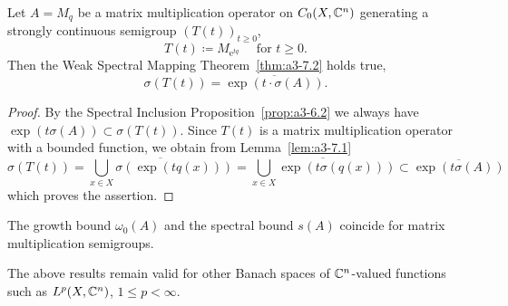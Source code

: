 \begin{theorem}\label{thm:a3-7.2}
Let $A = M_{q}$ be a matrix multiplication operator on $C_{0}(X,\mathbb{C}^{n})$ generating a strongly continuous semigroup $(T(t))_{t\geq 0}$, 
%
\[
	T(t) \coloneq M_{\mathrm{e}^{ t q} } \quad \text{ for $t \geq 0$.}
\]
%
Then the Weak Spectral Mapping Theorem~\ref{thm:a3-7.2} holds true, \ie 
\[
	\sigma(T(t)) = \overline{ \exp( t \cdot \sigma(A) ) } .
\]
\end{theorem}
\begin{proof}
By the Spectral Inclusion Proposition~\ref{prop:a3-6.2} we always have $\exp(t\sigma(A)) \subset \sigma(T(t))$.
Since $T(t)$ is a matrix multiplication operator with a bounded function, we obtain from Lemma~\ref{lem:a3-7.1}
\[
\sigma(T(t)) = \overline{\bigcup_{x\in X} \sigma(\exp(tq(x)))} = \overline{\bigcup_{x\in X} \exp(t\sigma(q(x)))} \subset \overline{\exp(t\sigma(A))}
\]
which proves the assertion.
\end{proof}
\begin{corollary}\label{cor:a3-7.3}
The growth bound $\omega_{0}(A)$ and the spectral bound $s(A)$ coincide for matrix multiplication semigroups.
\end{corollary}
The above results remain valid for other Banach spaces of $\mathbb{C}^{n}$-valued functions such as $L^{p}(X,\mathbb{C}^{n})$, $1 \leq p < \infty$.

